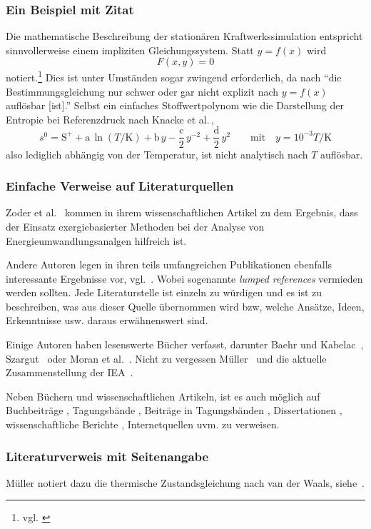 \subsubsection{Ein Beispiel mit Zitat}

Die mathematische Beschreibung der stationären Kraftwerkssimulation entspricht sinnvollerweise einem impliziten Gleichungssystem. Statt $y=f(x)$ wird 
\begin{equation}
F\left(x, y\right)=0
\end{equation}
notiert.\footnote{vgl. \cite[S.\,147]{papula2014}} Dies ist unter Umständen sogar zwingend erforderlich, da nach \cite[S.\,260]{westermann2011} "`die Bestimmungsgleichung nur schwer oder gar nicht explizit nach $y=f(x)$ auflösbar [ist]."' Selbst ein einfaches Stoffwertpolynom wie die Darstellung der Entropie bei Referenzdruck nach Knacke et al.\,\cite{knacke1991}, 
\begin{equation}
s^0=\text{S}^++\text{a}\,\ln(T/\text{K})+\text{b}\,y-\frac{\text{c}}{2}\,y^{-2}+\frac{\text{d}}{2}\,y^2\quad\quad\text{mit}\quad y=10^{-3}T/\text{K}
\label{eq:knacke_entropie}
\end{equation}
also lediglich abhängig von der Temperatur, ist nicht analytisch nach $T$ auflösbar.

\subsubsection{Einfache Verweise auf Literaturquellen}

Zoder et al.~\cite{zoder2018} kommen in ihrem wissenschaftlichen Artikel zu dem Ergebnis, dass der Einsatz exergiebasierter Methoden bei der Analyse von Energieumwandlungsanalgen hilfreich ist.

Andere Autoren legen in ihren teils umfangreichen Publikationen ebenfalls interessante Ergebnisse vor, vgl.~\cite{baehr1979,clausius1850,gasparovic1969,keenan1932,lojewski_urban1989}. Wobei sogenannte \textit{lumped references} vermieden werden sollten. Jede Literaturstelle ist einzeln zu würdigen und es ist zu beschreiben, was aus dieser Quelle übernommen wird bzw, welche Ansätze, Ideen, Erkenntnisse usw. daraus erwähnenswert sind.

Einige Autoren haben lesenswerte Bücher verfasst, darunter Baehr und Kabelac~\cite{baehr2012}, Szargut~\cite{szargut2007} oder Moran et al.~\cite{moran2014}. Nicht zu vergessen Müller~\cite{mueller2001} und die aktuelle Zusammenstellung der IEA~\cite{weo2016}.

Neben Büchern und wissenschaftlichen Artikeln, ist es auch möglich auf Buchbeiträge \cite{lojewski_urban1989}, Tagungsbände \cite{spliethoff2010a}, Beiträge in Tagungsbänden \cite{fraas1974,fraas1975}, Dissertationen \cite{ruegg1945,gaggioli1961}, wissenschaftliche Berichte \cite{gutstein1975,nas_3_10606_1968}, Internetquellen uvm. zu verweisen.

\subsubsection{Literaturverweis mit Seitenangabe}

Müller notiert dazu die thermische Zustandsgleichung nach van der Waals, siehe~\cite[S.~100]{mueller2001}.










